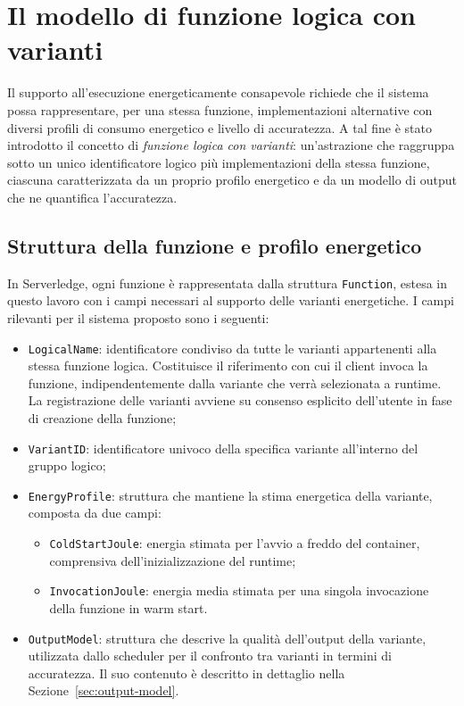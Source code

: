 \section{Il modello di funzione logica con varianti}
\label{sec:modello-varianti}
 
Il supporto all'esecuzione energeticamente consapevole richiede che il
sistema possa rappresentare, per una stessa funzione, implementazioni
alternative con diversi profili di consumo energetico e livello di accuratezza. 
A tal fine è stato introdotto il concetto di \emph{funzione logica con varianti}:
un'astrazione che raggruppa sotto un unico identificatore logico più
implementazioni della stessa funzione, ciascuna caratterizzata da un
proprio profilo energetico e da un modello di output che ne quantifica
l'accuratezza.
 
 
\subsection{Struttura della funzione e profilo energetico}
\label{subsec:struttura-funzione}
 
In Serverledge, ogni funzione è rappresentata dalla struttura
\texttt{Function}, estesa in questo lavoro con i campi necessari al
supporto delle varianti energetiche. I campi rilevanti per il sistema
proposto sono i seguenti:
 
\begin{itemize}
    \item \texttt{LogicalName}: identificatore condiviso da tutte le
    varianti appartenenti alla stessa funzione logica. Costituisce il
    riferimento con cui il client invoca la funzione, indipendentemente
    dalla variante che verrà selezionata a runtime. La registrazione
    delle varianti avviene su consenso esplicito dell'utente in fase di
    creazione della funzione;
 
    \item \texttt{VariantID}: identificatore univoco della specifica
    variante all'interno del gruppo logico;
 
    \item \texttt{EnergyProfile}: struttura che mantiene la stima
    energetica della variante, composta da due campi:
    \begin{itemize}
        \item \texttt{ColdStartJoule}: energia stimata per l'avvio a
        freddo del container, comprensiva dell'inizializzazione del
        runtime;
        \item \texttt{InvocationJoule}: energia media stimata per una
        singola invocazione della funzione in warm start.
    \end{itemize}
 
    \item \texttt{OutputModel}: struttura che descrive la qualità
    dell'output della variante, utilizzata dallo scheduler per il
    confronto tra varianti in termini di accuratezza. Il suo contenuto è
    descritto in dettaglio nella Sezione~\ref{sec:output-model}.
\end{itemize}
 
